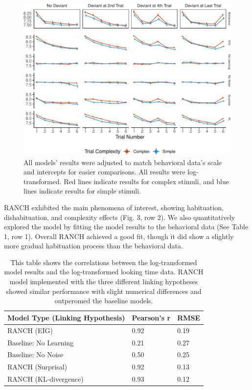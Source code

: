 \documentclass[10pt, letterpaper]{article}
\newenvironment{CodeChunk}{}{}
\begin{document}
\begin{CodeChunk}
\begin{figure}[t!]

{\centering \includegraphics{figs/experiment_res-1} 

}

\caption[All models’ results were adjusted to match behavioral data’s scale and intercepts for easier comparisons]{All models’ results were adjusted to match behavioral data’s scale and intercepts for easier comparisons. All results were log-transformed. Red lines indicate results for complex stimuli, and blue lines indicate results for simple stimuli.}\label{fig:experiment_res}
\end{figure}
\end{CodeChunk}

RANCH exhibited the main phenomena of interest, showing habituation,
dishabituation, and complexity effects (Fig. 3, row 2). We also
quantitatively explored the model by fitting the model results to the
behavioral data (See Table 1, row 1). Overall RANCH achieved a good fit,
though it did show a slightly more gradual habituation process than the
behavioral data.

\begin{table}[ht]
\centering
\begin{tabular}{lll}
  \hline
Model Type (Linking Hypothesis) & Pearson's r & RMSE \\ 
  \hline
RANCH (EIG) & 0.92 & 0.19 \\ 
  Baseline: No Learning & 0.21 & 0.27 \\ 
  Baseline: No Noise & 0.50 & 0.25 \\ 
  RANCH (Surprisal) & 0.92 & 0.13 \\ 
  RANCH (KL-divergence) & 0.93 & 0.12 \\ 
   \hline
\end{tabular}
\caption{This table shows the correlations between the log-transformed model results and the log-transformed looking time data. RANCH model implemented with the three different linking hypotheses showed similar performance with slight numerical differences and outperomed the baseline models.} 
\end{table}
\end{document}
